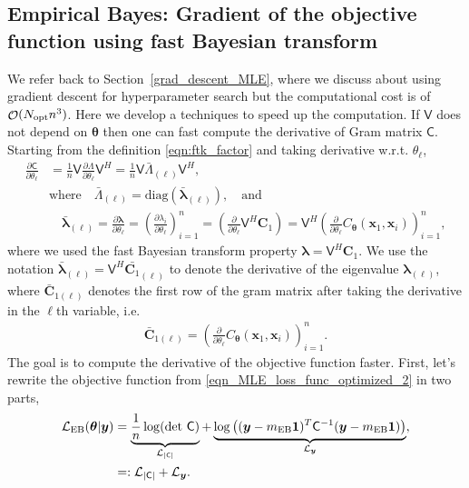 \documentclass{svjour3}                     %
\DeclareMathOperator{\Order}{{\mathcal O}}
\newcommand{\bm}[1]{\boldsymbol{#1}}
\newcommand{\vlambda}{{\bm{\lambda}}}
\newcommand{\vtheta}{{\bm{\theta}}}
\newcommand{\vC}{\bm{C}}
\newcommand{\vx}{\bm{x}}
\newcommand{\vy}{\bm{y}}
\newcommand{\vone}{\bm{1}}
\newcommand{\mC}{\mathsf{C}}
\newcommand{\mCInv}{\mathsf{C}^{-1}}
\newcommand{\opt}{{\textup{opt}}}
\newcommand{\mLambda}{\mathsf{\Lambda}}
\newcommand{\mV}{\mathsf{V}}
\newcommand{\MLE}{\textup{EB}}
\newcommand{\diag}{\text{diag}}
\def\abs#1{\ensuremath{\left \lvert #1 \right \rvert}}
\begin{document}
\subsection{Empirical Bayes: Gradient of the objective function using fast Bayesian transform} \label{deriv_obj_func_MLE} 
We refer back to Section~\ref{grad_descent_MLE}, where we discuss about using gradient descent for hyperparameter search but the computational cost is of $\Order(N_{\opt} n^3)$. Here we develop a techniques to speed up the computation.
If $\mV$ does not depend on $\vtheta$ then one can fast compute the derivative of Gram matrix $\mC$. Starting from the definition \eqref{eqn:ftk_factor} and taking derivative w.r.t. $\theta_\ell$, 
\begin{align}
\nonumber
\displaystyle \frac{\partial \mC}{\partial \theta_\ell} 
& = \frac 1n \mV \frac{\partial {\mLambda}}{\partial \theta_\ell} \mV^H
= \frac 1n \mV \bar{\mLambda}_{(\ell)} \mV^H,
\\
\nonumber
& \text{where} \quad \bar{\mLambda}_{(\ell)} = \diag(\bar{\vlambda}_{(\ell)}), \quad \text{and}
\\
\label{eqn:deriv_eigenval_gram_matrix}
&  \quad \bar{\vlambda}_{(\ell)} = \frac{\partial \vlambda}{\partial \theta_\ell} = \left( \frac{\partial \lambda_i}{\partial \theta_\ell} \right)_{i=1}^n 
= \left( \frac{\partial }{\partial \theta_\ell} \mV^H {\vC_1} \right)
= \mV^H \left( \frac{\partial }{\partial \theta_\ell} {C_\vtheta(\vx_1,\vx_i)} \right)_{i=1}^n,
\end{align}
where we used the fast Bayesian transform property $\vlambda 
= \mV^H \vC_1$. %
We use the notation $\bar{\vlambda}_{(\ell)} = \mV^H \bar{\vC_1}_{(\ell)}$ to denote the derivative of the eigenvalue ${\vlambda}_{(\ell)}$,  where $\bar{\vC}_{1(\ell)}$ denotes the first row of the gram matrix after taking the derivative in the $\ell$th variable, i.e.
\begin{align*}
\bar{\vC}_{1{(\ell)}} = \left(\frac{\partial }{\partial{\theta}_\ell} C_\vtheta(\vx_1,\vx_i) \right)_{i=1}^n.
\end{align*}
The goal is to compute the derivative of the objective function faster. First, let's rewrite the objective function from \eqref{eqn_MLE_loss_func_optimized_2} in two parts,
\begin{align*}
\mathcal{L}_{\MLE}(\vtheta | \vy) &= 
\underbrace{\frac{1}{n}  \log(\det\, \mC)}_{\mathcal{L}_{\abs{\mC}}} + \underbrace{\log\left((\vy-m_\MLE\vone)^T\mCInv(\vy-m_\MLE\vone) \right)}_{\mathcal{L}_{\vy}},
\\ &=: \mathcal{L}_{\abs{\mC}} + \mathcal{L}_{\vy}.
\end{align*}
\end{document}
